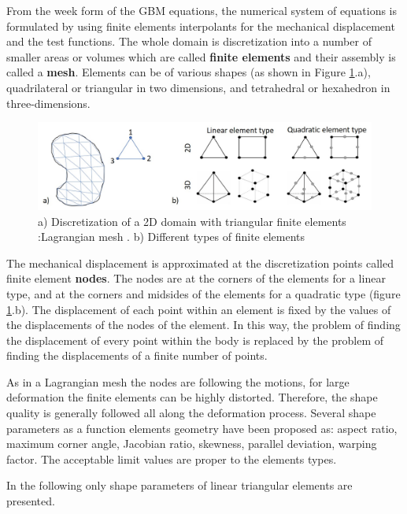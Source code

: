 From the week form of the GBM equations, the numerical system of equations is formulated by using finite elements interpolants for the mechanical displacement and the test functions.   The whole domain is discretization into a number of smaller areas or volumes which are called \textbf{finite elements} and their assembly is called a\textbf{ mesh}. Elements can be of various shapes (as shown in Figure \ref{discretization}.a),  quadrilateral or triangular in two dimensions, and tetrahedral or hexahedron in three-dimensions.


\begin{figure}[!h]
\centering
\includegraphics[width=1\textwidth,keepaspectratio]{figures/discretization.jpg} 
\caption{a) Discretization of  a 2D domain with triangular finite elements :Lagrangian mesh . b) Different types of finite elements}
\label{discretization}
\end{figure}

 The mechanical displacement is approximated at the discretization points called finite element\textbf{ nodes}. The nodes are at the corners of the elements for a linear type, and at the corners and midsides of the elements for a quadratic type (figure \ref{discretization}.b). The displacement of each point within an element is fixed by the values of the displacements of the nodes of the element. In this way, the problem of finding the displacement of every point within the body is replaced by the problem of finding the displacements of a finite number of points.
 
 As in a Lagrangian mesh the nodes are following the motions, for large deformation the finite elements can be highly distorted. Therefore, the shape quality is generally followed all along the deformation process. Several shape parameters as a function elements geometry have been proposed as: aspect ratio, maximum corner angle, Jacobian ratio, skewness, parallel deviation, warping factor. The acceptable limit values are proper to the elements types. 
 
In the following only shape parameters of linear triangular elements are presented.  
